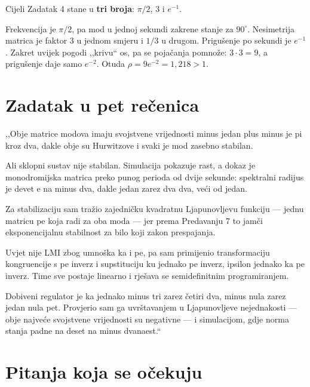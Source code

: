 \begin{izgovor}
Cijeli Zadatak 4 stane u \textbf{tri broja}: $\pi/2$, $3$ i $e^{-1}$.

Frekvencija je $\pi/2$, pa mod u jednoj sekundi zakrene stanje za $90^\circ$.
Nesimetrija matrica je faktor $3$ u jednom smjeru i $1/3$ u drugom. Prigušenje po
sekundi je $e^{-1}$. Zakret uvijek pogodi ,,krivu`` os, pa se pojačanja
pomnože: $3 \cdot 3 = 9$, a prigušenje daje samo $e^{-2}$. Otuda
$\rho = 9e^{-2} = 1{,}218 > 1$.
\end{izgovor}

\section{Zadatak u pet rečenica}
\label{sec:z4o-sazetak}

\begin{izgovor}
,,Obje matrice modova imaju svojstvene vrijednosti minus jedan plus minus je pi
kroz dva, dakle obje su Hurwitzove i svaki je mod zasebno stabilan.

Ali sklopni sustav nije stabilan. Simulacija pokazuje rast, a dokaz je
monodromijska matrica preko punog perioda od dvije sekunde: spektralni radijus je
devet e na minus dva, dakle jedan zarez dva dva, veći od jedan.

Za stabilizaciju sam tražio zajedničku kvadratnu Ljapunovljevu funkciju --- jednu
matricu pe koja radi za oba moda --- jer prema Predavanju 7 to jamči
eksponencijalnu stabilnost za bilo koji zakon prespajanja.

Uvjet nije LMI zbog umnoška ka i pe, pa sam primijenio transformaciju kongruencije
s pe inverz i supstituciju ku jednako pe inverz, ipsilon jednako ka pe inverz.
Time sve postaje linearno i rješava se semidefinitnim programiranjem.

Dobiveni regulator je ka jednako minus tri zarez četiri dva, minus nula zarez
jedan nula pet. Provjerio sam ga uvrštavanjem u Ljapunovljeve nejednakosti ---
obje najveće svojstvene vrijednosti su negativne --- i simulacijom, gdje norma
stanja padne na deset na minus dvanaest.``
\end{izgovor}

\section{Pitanja koja se očekuju}
\label{sec:z4o-pitanja}

